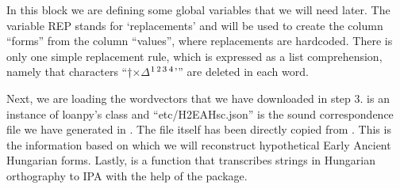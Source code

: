 \documentclass[letterpaper,10pt,english]{sphinxmanual}
\begin{document}
\begin{sphinxVerbatim}[commandchars=\\\{\}]
  \PYG{p}{[}     \PYG{p}{]}
  
  
  
\end{sphinxVerbatim}

\sphinxAtStartPar
In this block we are defining some global variables that we will need later.
The variable REP stands for ‘replacements’ and will be used to create
the column “forms” from the column “values”, where replacements are hard\sphinxhyphen{}coded.
There is only one simple replacement rule, which is expressed as a list
comprehension, namely that characters “†×\(\Delta\)\sphinxhyphen{}\(\sp{\text{1}}\)\(\sp{\text{2}}\)\(\sp{\text{3}}\)\(\sp{\text{4}}\)’” are deleted in each
word.

\sphinxAtStartPar
Next, we are loading the word\sphinxhyphen{}vectors that we have downloaded in step 3.
 is an instance of
loanpy’s 
class and “etc/H2EAHsc.json” is the sound correspondence file
we have generated in .
The file itself has been directly copied from
. This is the information based
on which we will reconstruct hypothetical Early Ancient Hungarian forms.
Lastly,  is a function that transcribes strings in Hungarian
orthography to IPA with the help of the  package.

\begin{sphinxVerbatim}[commandchars=\\\{\}]
 
      
      
      
\end{sphinxVerbatim}
\end{document}

